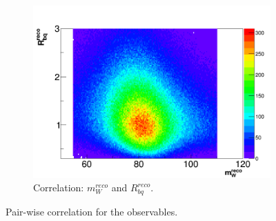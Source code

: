 \begin{figure} [h]
	\begin{subfigure}{0.35\textwidth}
	\includegraphics[width=\linewidth]{Pics/PlotCombi/mwRbq2.png}
	\caption{Correlation:  $m_{W}^{reco}$ and $R_{bq}^{reco}$.} \label{fig:1c}
	\end{subfigure}

	\caption{Pair-wise correlation for the observables.}
\end{figure}	
